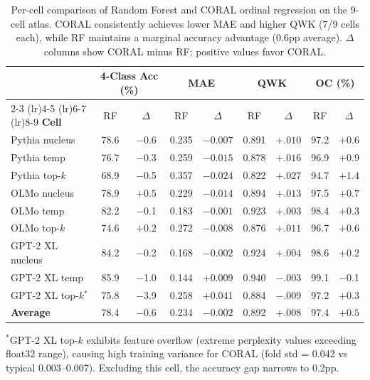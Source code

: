 
\begin{table}[t]
\centering
\caption{Per-cell comparison of Random Forest and CORAL ordinal regression on the 9-cell atlas. CORAL consistently achieves lower MAE and higher QWK (7/9 cells each), while RF maintains a marginal accuracy advantage (0.6pp average). $\Delta$ columns show CORAL minus RF; positive values favor CORAL.}
\label{tab:coral_percell}
\small
\begin{tabular}{@{}lcccccccc@{}}
\toprule
& \multicolumn{2}{c}{\textbf{4-Class Acc (\%)}} & \multicolumn{2}{c}{\textbf{MAE}} & \multicolumn{2}{c}{\textbf{QWK}} & \multicolumn{2}{c}{\textbf{OC (\%)}} \\
\cmidrule(lr){2-3} \cmidrule(lr){4-5} \cmidrule(lr){6-7} \cmidrule(lr){8-9}
\textbf{Cell} & RF & $\Delta$ & RF & $\Delta$ & RF & $\Delta$ & RF & $\Delta$ \\
\midrule
Pythia nucleus & 78.6 & $-$0.6 & 0.235 & $\mathbf{-0.007}$ & 0.891 & $\mathbf{+.010}$ & 97.2 & $\mathbf{+0.6}$ \\
Pythia temp & 76.7 & $-$0.3 & 0.259 & $\mathbf{-0.015}$ & 0.878 & $\mathbf{+.016}$ & 96.9 & $\mathbf{+0.9}$ \\
Pythia top-$k$ & 68.9 & $-$0.5 & 0.357 & $\mathbf{-0.024}$ & 0.822 & $\mathbf{+.027}$ & 94.7 & $\mathbf{+1.4}$ \\
OLMo nucleus & 78.9 & $\mathbf{+0.5}$ & 0.229 & $\mathbf{-0.014}$ & 0.894 & $\mathbf{+.013}$ & 97.5 & $\mathbf{+0.7}$ \\
OLMo temp & 82.2 & $-$0.1 & 0.183 & $\mathbf{-0.001}$ & 0.923 & $\mathbf{+.003}$ & 98.4 & $\mathbf{+0.3}$ \\
OLMo top-$k$ & 74.6 & $\mathbf{+0.2}$ & 0.272 & $\mathbf{-0.008}$ & 0.876 & $\mathbf{+.011}$ & 96.7 & $\mathbf{+0.6}$ \\
GPT-2 XL nucleus & 84.2 & $-$0.2 & 0.168 & $\mathbf{-0.002}$ & 0.924 & $\mathbf{+.004}$ & 98.6 & $\mathbf{+0.2}$ \\
GPT-2 XL temp & 85.9 & $-$1.0 & 0.144 & $+$0.009 & 0.940 & $-$.003 & 99.1 & $-$0.1 \\
GPT-2 XL top-$k$$^*$ & 75.8 & $-$3.9 & 0.258 & $+$0.041 & 0.884 & $-$.009 & 97.2 & $+$0.3 \\
\midrule
\textbf{Average} & 78.4 & $-$0.6 & 0.234 & $\mathbf{-0.002}$ & 0.892 & $\mathbf{+.008}$ & 97.4 & $\mathbf{+0.5}$ \\
\bottomrule
\end{tabular}

\vspace{0.3em}
\footnotesize{$^*$GPT-2 XL top-$k$ exhibits feature overflow (extreme perplexity values exceeding float32 range), causing high training variance for CORAL (fold std = 0.042 vs typical 0.003--0.007). Excluding this cell, the accuracy gap narrows to 0.2pp.}
\end{table}
